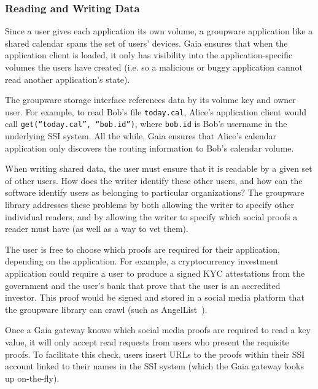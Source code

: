 \subsubsection{Reading and Writing Data}

Since a user gives each application its own volume, a groupware application like
a shared calendar spans the set of users' devices.  Gaia ensures that when the
application client is loaded, it only has visibility into the
application-specific volumes the users have created (i.e. so a malicious
or buggy application cannot read another application's state).

The groupware storage interface references data by its volume key and owner user.  For
example, to read Bob's file \texttt{today.cal}, Alice's application client would call
\texttt{get(``today.cal'', ``bob.id'')}, where \texttt{bob.id} is Bob's username
in the underlying SSI system.  All the while, Gaia
ensures that Alice's calendar application only discovers the routing information 
to Bob's calendar volume.

\hfill \break
{}
\hfill \break

When writing shared data, the user must ensure that it is readable by a given
set of other users.  How does the writer identify these other users,
and how can the software identify users as belonging to particular
organizations?  The groupware library addresses these problems by both allowing
the writer to specify other individual readers, and by allowing the writer
to specify which social proofs a reader must have (as well as a way to vet
them).  

The user is free to choose which proofs are required for their
application, depending on the application.  For example, a cryptocurrency
investment application could require a user to produce a signed KYC attestations
from the government and the user's bank that prove that the user is an
accredited investor.  This proof would be signed and stored in a social media
platform that the groupware library can crawl (such as
AngelList~\cite{angellist}).

Once a Gaia gateway knows which social media proofs are required to read
a key value, it will only accept read requests from users who present
the requisite proofs.  To facilitate this check, users insert URLs to the
proofs within their SSI account linked to their names in the SSI system (which
the Gaia gateway looks up on-the-fly).

\hfill \break
{}
\hfill \break

